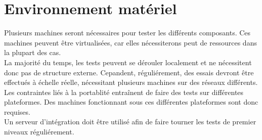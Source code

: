 \section{Environnement matériel}
Plusieurs machines seront nécessaires pour tester les différents composants. Ces machines peuvent être virtualisées, car elles nécessiterons peut de ressources dans la plupart des cas.\\

La majorité du temps, les tests peuvent se dérouler localement et ne nécessitent donc pas de structure externe. Cepandent, réguliérement, des essais devront être effectués à échelle réelle, nécessitant plusieurs machines sur des réseaux différents.\\

Les contraintes liés à la portablité entraînent de faire des tests sur différentes plateformes. Des machines fonctionnant sous ces différentes plateformes sont donc requises.\\

Un serveur d'intégration doit être utilisé afin de faire tourner les tests de premier niveaux réguliérement.\\
